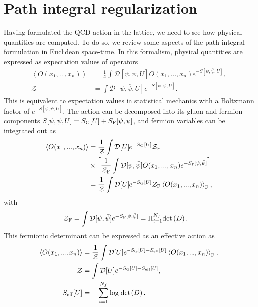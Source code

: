 \section{Path integral regularization}
\label{ch_foundation:sec:path}

Having formulated the QCD action in the lattice, we need to see how physical quantities are computed. To do so, we review some aspects of the path integral formulation in Euclidean space-time. In this formalism, physical quantities are expressed as expectation values of operators
\begin{align}
\left<{O}(x_1,...,x_n)\right>&=\frac{1}{\mathcal{Z}}\int\mathcal{D}[\psi,\bar{\psi},U]{O}(x_1,...,x_n)e^{-S[\psi,\bar{\psi},U]}, \\
\mathcal{Z}&=\int\mathcal{D}[\psi,\bar{\psi},U]e^{-S[\psi,\bar{\psi},U]}.
\end{align}
This is equivalent to expectation values in statistical mechanics with a Boltzmann factor of $e^{-S[\psi,\bar{\psi},U]}$. The action can be decomposed into its gluon and fermion components $S[\psi,\bar{\psi},U]=S_{\textrm G}[U]+S_{\textrm F}[\psi,\bar{\psi}]$, and fermion variables can be integrated out as
\begin{align}
\left<{O}(x_1,...,x_n)\right>&=\frac{1}{\mathcal{Z}}\int\mathcal{D}[U]e^{-S_{\textrm G}[U]}\mathcal{Z}_{\textrm F}\notag \\
&\times\left[\frac{1}{\mathcal{Z}_{\textrm F}}\int\mathcal{D}[\psi,\bar{\psi}]{O}(x_1,...,x_n)e^{-S_{\textrm F}[\psi,\bar{\psi}]}\right] \\
&=\frac{1}{\mathcal{Z}}\int\mathcal{D}[U]e^{-S_{\textrm G}[U]}\mathcal{Z}_{\textrm F}\left<{O}(x_1,...,x_n)\right>_{\textrm F},
\end{align}
with 
\begin{align}
\mathcal{Z}_{\textrm F}&=\int\mathcal{D}[\psi,\bar{\psi}]e^{-S_{\textrm F}[\psi,\bar{\psi}]}=\Pi_{i=1}^{N_f}{\textrm{det}}\left(D\right).
\end{align}
This fermionic determinant can be expressed as an effective action as
\begin{align}
\left<{O}(x_1,...,x_n)\right>&=\frac{1}{\mathcal{Z}}\int\mathcal{D}[U]e^{-S_{\textrm G}[U]-S_{\textrm{eff}}[U]}\left<{O}(x_1,...,x_n)\right>_{\textrm F}, \\
\mathcal{Z}&=\int\mathcal{D}[U]e^{-S_{\textrm G}[U]-S_{\textrm{eff}}[U]}, \\
S_{\textrm{eff}}[U]&=-\sum_{i=1}^{N_f}{\textrm{log}}\;{\textrm{det}}\left(D\right).
\end{align}

